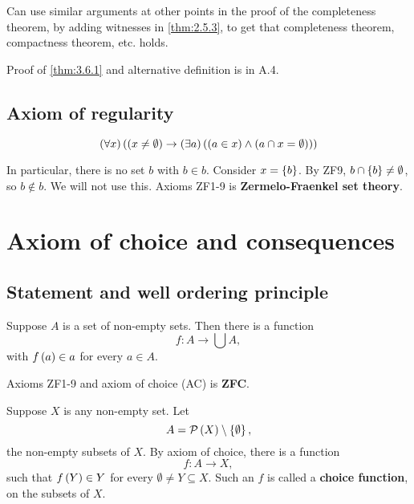 
\begin{remark1}
Can use similar arguments at other points in the proof of the completeness theorem, by adding witnesses in \ref{thm:2.5.3}, to get that completeness theorem, compactness theorem, etc. holds.
\end{remark1}

Proof of \ref{thm:3.6.1} and alternative definition is in A.4.

\subsection{Axiom of regularity}

\begin{axiom}
$$ \left( \forall x \right)\left( \left( x \ne \emptyset \right) \rightarrow \left( \exists a \right)\left( \left( a \in x \right) \land \left( a \cap x = \emptyset \right) \right) \right) $$
\end{axiom}

In particular, there is no set $ b $ with $ b \in b $. Consider $ x = \left\{ b \right\} $. By ZF9, $ b \cap \left\{ b \right\} \ne \emptyset $, so $ b \notin b $. We will not use this. Axioms ZF1-9 is \textbf{Zermelo-Fraenkel set theory}.

\pagebreak

\section{Axiom of choice and consequences}

\subsection{Statement and well ordering principle}

\begin{definition}
Suppose $ A $ is a set of non-empty sets. Then there is a function
$$ f : A \to \bigcup A, $$
with $ f\left( a \right) \in a $ for every $ a \in A $.
\end{definition}

Axioms ZF1-9 and axiom of choice (AC) is \textbf{ZFC}.

\begin{example1}
Suppose $ X $ is any non-empty set. Let
$$ A = \mathcal{P}\left( X \right) \setminus \left\{ \emptyset \right\}, $$
the non-empty subsets of $ X $. By axiom of choice, there is a function
$$ f : A \to X, $$
such that $ f\left( Y \right) \in Y $ for every $ \emptyset \ne Y \subseteq X $. Such an $ f $ is called a \textbf{choice function}, on the subsets of $ X $.
\end{example1}

